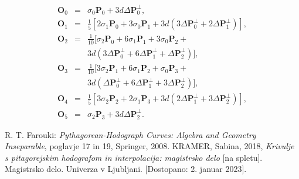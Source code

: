 \documentclass[12pt]{article}
\begin{document}
\begin{eqnarray}
	\textbf{O}_0 &=& \sigma_0 \textbf{P}_0 + 3 d \Delta \textbf{P}_0^{\perp},\nonumber \\
	\textbf{O}_1 &=& \frac{1}{5} [2 \sigma_1 \textbf{P}_0 + 3\sigma_0 \textbf{P}_1 + 3 d (3 \Delta \textbf{P}_0^{\perp} + 2 \Delta \textbf{P}_1^{\perp})],\nonumber \\
	\textbf{O}_2 &=& \frac{1}{10} [\sigma_2 \textbf{P}_0 + 6\sigma_1 \textbf{P}_1 + 3\sigma_0 \textbf{P}_2 + \nonumber \\
		& & 3 d (3 \Delta \textbf{P}_0^{\perp} + 6 \Delta \textbf{P}_1^{\perp} + \Delta \textbf{P}_2^{\perp})],\nonumber \\
	\textbf{O}_3 &=& \frac{1}{10} [3\sigma_2 \textbf{P}_1 + 6\sigma_1 \textbf{P}_2 + \sigma_0 \textbf{P}_3 + \nonumber \\
		& & 3 d (\Delta \textbf{P}_0^{\perp} + 6 \Delta \textbf{P}_1^{\perp} + 3 \Delta \textbf{P}_2^{\perp})],\nonumber \\
	\textbf{O}_4 &=& \frac{1}{5} [3\sigma_2 \textbf{P}_2 + 2\sigma_1 \textbf{P}_3 + 3 d (2\Delta \textbf{P}_1^{\perp} + 3 \Delta \textbf{P}_2^{\perp})],\nonumber \\
	\textbf{O}_5 &=& \sigma_2 \textbf{P}_3 + 3 d \Delta \textbf{P}_2^{\perp}.\nonumber
\end{eqnarray}

\begin{figure}[h]
    \centering
    \qquad
    \label{fig:example}%
\end{figure}

\pagebreak

\begin{thebibliography}{1}
	 R. T. Farouki: \textit{Pythagorean-Hodograph Curves: Algebra and Geometry Inseparable}, poglavje 17 in 19, Springer, 2008.
	 KRAMER, Sabina, 2018, \textit{Krivulje s pitagorejskim hodografom in interpolacija: magistrsko delo} [na spletu]. Magistrsko delo. Univerza v Ljubljani. [Dostopano: 2. januar 2023].

\end{thebibliography}
\end{document}
